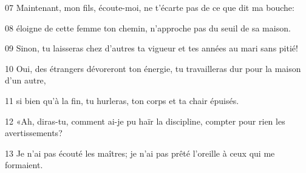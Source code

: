 
07 Maintenant, mon fils, écoute-moi, ne t’écarte pas de ce que dit ma bouche:

08 éloigne de cette femme ton chemin, n’approche pas du seuil de sa maison.

09 Sinon, tu laisseras chez d’autres ta vigueur et tes années au mari sans pitié!

10 Oui, des étrangers dévoreront ton énergie, tu travailleras dur pour la maison d’un autre,

11 si bien qu’à la fin, tu hurleras, ton corps et ta chair épuisés.

12 «Ah, diras-tu, comment ai-je pu haïr la discipline, compter pour rien les avertissements?

13 Je n’ai pas écouté les maîtres; je n’ai pas prêté l’oreille à ceux qui me formaient.
